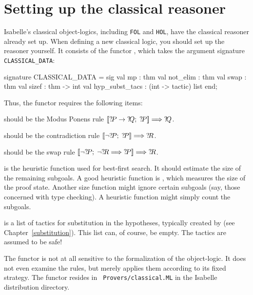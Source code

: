 \section{Setting up the classical reasoner}
Isabelle's classical object-logics, including {\tt FOL} and {\tt HOL}, have
the classical reasoner already set up.  When defining a new classical logic,
you should set up the reasoner yourself.  It consists of the \ML{} functor
, which takes the argument
signature {\tt CLASSICAL_DATA}:
\begin{ttbox} 
signature CLASSICAL_DATA =
  sig
  val mp             : thm
  val not_elim       : thm
  val swap           : thm
  val sizef          : thm -> int
  val hyp_subst_tacs : (int -> tactic) list
  end;
\end{ttbox}
Thus, the functor requires the following items:
\begin{ttdescription}
\item[\tdxbold{mp}] should be the Modus Ponens rule
$\mathopen{[\![}{?\!P}\rightarrow{?\!Q};\; {?\!P}\mathclose{]\!]} \Longrightarrow {?\!Q}$.

\item[\tdxbold{not_elim}] should be the contradiction rule
$\mathopen{[\![}\neg{?\!P};\; {?\!P}\mathclose{]\!]} \Longrightarrow {?\!R}$.

\item[\tdxbold{swap}] should be the swap rule
$\mathopen{[\![}\neg {?\!P}; \; \neg {?\!R}\Longrightarrow {?\!P}\mathclose{]\!]} \Longrightarrow {?\!R}$.

\item[\ttindexbold{sizef}] is the heuristic function used for best-first
search.  It should estimate the size of the remaining subgoals.  A good
heuristic function is , which measures the size of the
proof state.  Another size function might ignore certain subgoals (say,
those concerned with type checking).  A heuristic function might simply
count the subgoals.

\item[\ttindexbold{hyp_subst_tacs}] is a list of tactics for substitution in
the hypotheses, typically created by  (see
Chapter~\ref{substitution}).  This list can, of course, be empty.  The
tactics are assumed to be safe!
\end{ttdescription}
The functor is not at all sensitive to the formalization of the
object-logic.  It does not even examine the rules, but merely applies them
according to its fixed strategy.  The functor resides in {\tt
Provers/classical.ML} in the Isabelle distribution directory.

